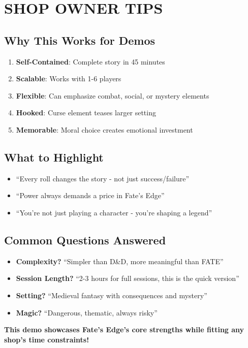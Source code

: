 \documentclass[12pt]{article}
\begin{document}
\section{SHOP OWNER TIPS}

\subsection*{Why This Works for Demos}
\begin{enumerate}
\item \textbf{Self-Contained}: Complete story in 45 minutes
\item \textbf{Scalable}: Works with 1-6 players  
\item \textbf{Flexible}: Can emphasize combat, social, or mystery elements
\item \textbf{Hooked}: Curse element teases larger setting
\item \textbf{Memorable}: Moral choice creates emotional investment
\end{enumerate}

\subsection*{What to Highlight}
\begin{itemize}
\item ``Every roll changes the story - not just success/failure''
\item ``Power always demands a price in Fate's Edge''
\item ``You're not just playing a character - you're shaping a legend''
\end{itemize}

\subsection*{Common Questions Answered}
\begin{itemize}
\item \textbf{Complexity?} ``Simpler than D&D, more meaningful than FATE''
\item \textbf{Session Length?} ``2-3 hours for full sessions, this is the quick version''  
\item \textbf{Setting?} ``Medieval fantasy with consequences and mystery''
\item \textbf{Magic?} ``Dangerous, thematic, always risky''
\end{itemize}

\begin{center}
\textbf{This demo showcases Fate's Edge's core strengths while fitting any shop's time constraints!}
\end{center}
\end{document}
